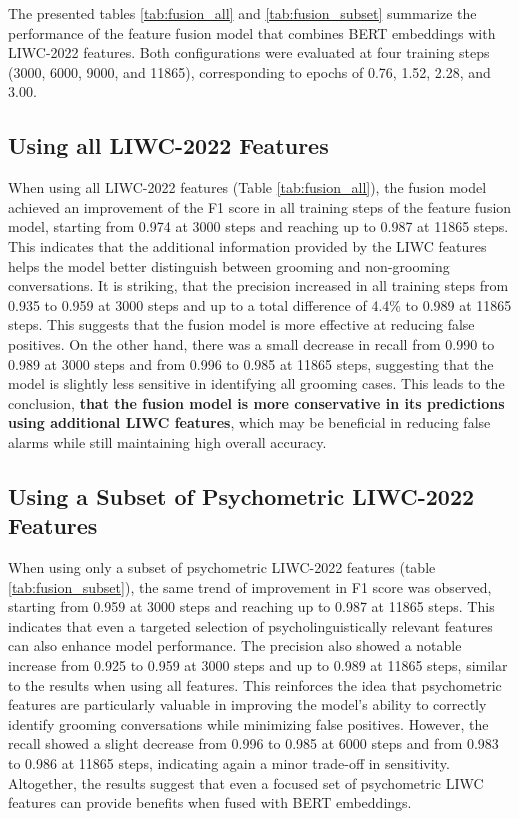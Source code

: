 The presented tables \ref{tab:fusion_all} and \ref{tab:fusion_subset} summarize the performance of the feature fusion model that combines BERT embeddings with LIWC-2022 features. Both configurations were evaluated at four training steps (3000, 6000, 9000, and 11865), corresponding to epochs of 0.76, 1.52, 2.28, and 3.00.

\subsection{Using all LIWC-2022 Features}

When using all LIWC-2022 features (Table \ref{tab:fusion_all}), the fusion model achieved an improvement of the F1 score in all training steps of the feature fusion model, starting from 0.974 at 3000 steps and reaching up to 0.987 at 11865 steps. This indicates that the additional information provided by the LIWC features helps the model better distinguish between grooming and non-grooming conversations. It is striking, that the precision increased in all training steps from 0.935 to 0.959 at 3000 steps and up to a total difference of 4.4\% to 0.989 at 11865 steps. This suggests that the fusion model is more effective at reducing false positives. On the other hand, there was a small decrease in recall from 0.990 to 0.989 at 3000 steps and from 0.996 to 0.985 at 11865 steps, suggesting that the model is slightly less sensitive in identifying all grooming cases. This leads to the conclusion, \textbf{that the fusion model is more conservative in its predictions using additional LIWC features}, which may be beneficial in reducing false alarms while still maintaining high overall accuracy.

\subsection{Using a Subset of Psychometric LIWC-2022 Features}

When using only a subset of psychometric LIWC-2022 features (table \ref{tab:fusion_subset}), the same trend of improvement in F1 score was observed, starting from 0.959 at 3000 steps and reaching up to 0.987 at 11865 steps. This indicates that even a targeted selection of psycholinguistically relevant features can also enhance model performance. The precision also showed a notable increase from 0.925 to 0.959 at 3000 steps and up to 0.989 at 11865 steps, similar to the results when using all features. This reinforces the idea that psychometric features are particularly valuable in improving the model's ability to correctly identify grooming conversations while minimizing false positives. However, the recall showed a slight decrease from 0.996 to 0.985 at 6000 steps and from 0.983 to 0.986 at 11865 steps, indicating again a minor trade-off in sensitivity. Altogether, the results suggest that even a focused set of psychometric LIWC features can provide benefits when fused with BERT embeddings.


